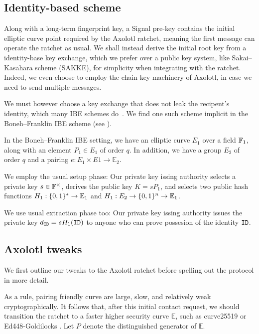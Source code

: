 \documentclass[twoside,letterpaper]{sig-alternate}
\begin{document}
\subsection{Identity-based scheme}

Along with a long-term fingerprint key,
a Signal pre-key contains the initial elliptic curve point required
by the Axolotl ratchet, meaning
 the first message can operate the ratchet as usual.
We shall instead derive the initial root key from a identity-base key
exchange, which we prefer over a public key system,
 like Sakai–Kasahara scheme (SAKKE),
for simplicity when integrating with the ratchet.
Indeed, we even choose to employ the chain key machinery of Axolotl,
 in case we need to send multiple messages. 

We must however choose a key exchange that does not leak the recipent's
identity, which many IBE schemes do~\cite{AnonIBE}.  
We find one such scheme implicit in the Boneh–Franklin IBE scheme 
\cite{BF-IBE} (see \cite[??]{BoyenMIBS}).

In the Boneh–Franklin IBE setting,
we have an elliptic curve $E_1$ over a field $\mathbb{F}_1$,
 along with an element $P_1 \in E_1$ of order $q$.
In addition, we have a group $E_2$ of order $q$ and 
 a pairing $e : E_1 \times E1 \to \mathbb{E}_2$.

We employ the usual setup phase: 
Our private key issing authority
 selects a private key $s \in \mathbb{F}^\times$,
 derives the public key $K = s P_1$, and
 selects two public hash functions
  $H_1 : \{0,1\}^* \to \mathbb{E}_1$ and $H_1 : E_2 \to \{0,1\}^n \to \mathbb{E}_1$.

We use usual extraction phase too: 
Our private key issing authority
issues the private key $d_{\mathtt{ID}} = s H_1(\mathtt{ID})$ to anyone who
 can prove possesion of the identity $\mathtt{ID}$.

\subsection{Axolotl tweaks} %

We first outline our tweaks to the Axolotl ratchet before 
 spelling out the protocol in more detail.

As a rule, pairing friendly curve are large, slow, and relatively
 weak cryptographically.
It follows that, after this initial contact request, we should 
transition the ratchet to a faster higher security curve $\mathbb{E}$,
such as curve25519 \cite{DJB-Curve25519}
 or Ed448-Goldilocks \cite{Ed448-Goldilocks}.
Let $P$ denote the distinguished generator of $\mathbb{E}$.
\end{document}
